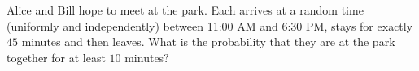 Alice and Bill hope to meet at the park. Each arrives at a random time (uniformly and independently) between 11{:}00 AM and 6{:}30 PM, stays for exactly $45$ minutes and then leaves. What is the probability that they are at the park together for at least $10$ minutes?
